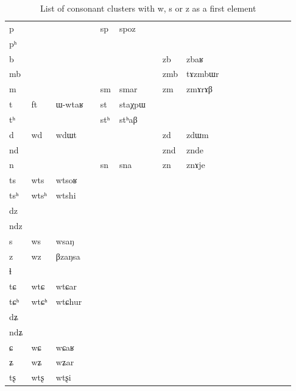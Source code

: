 \documentclass[oldfontcommands,oneside,a4paper,11pt]{article}
\newcommand{\ipa}[1]{{\phon #1}} %
\begin{document}
 
 \begin{table}
 \caption{List of consonant clusters with \ipa{w}, \ipa{s} or \ipa{z} as a first element}
\begin{tabular}{l|lll|lll|lll|lllllll}
\ipa{p}  &	  &	  &	&	\ipa{sp}  &	\ipa{spoz}  &	&	  &	  &	&	\\
\ipa{pʰ}  &	  &	  &	&	  &	  &	&	  &	  &	&	\\
\ipa{b}  &	  &	  &	&	  &	  &	&	\ipa{zb}  &	\ipa{zbaʁ}  &	&	\\
\ipa{mb}  &	  &	  &	&	  &	  &	&	\ipa{zmb}  &	\ipa{tɤzmbɯr}  &	&	\\
\ipa{m}  &	  &	  &	&	\ipa{sm}  &	\ipa{smar}  &	&	\ipa{zm}  &	\ipa{zmɤrɤβ}  &	&	\\
\ipa{t}  &	\ipa{ft}  &	\ipa{ɯ-wtaʁ}  &	&	\ipa{st}  &	\ipa{staχpɯ}  &	&	  &	  &	&	\\
\ipa{tʰ}  &	  &	  &	&	\ipa{stʰ}  &	\ipa{stʰaβ}  &	&	  &	  &	&	\\
\ipa{d}  &	\ipa{wd}  &	\ipa{wdɯt}  &	&	  &	  &	&	\ipa{zd}  &	\ipa{zdɯm}  &	&	\\
\ipa{nd}  &	  &	  &	&	  &	  &	&	\ipa{znd}  &	\ipa{znde}  &	&	\\
\ipa{n}  &	  &	  &	&	\ipa{sn}  &	\ipa{sna}  &	&	\ipa{zn}  &	\ipa{znɤje}  &	&	\\
\ipa{ts}  &	\ipa{wts}  &	\ipa{wtsoʁ}  &	&	  &	  &	&	  &	  &	&	\\
\ipa{tsʰ}  &	\ipa{wtsʰ}  &	\ipa{wtshi}  &	&	  &	  &	&	  &	  &	&	\\
\ipa{dz}  &	  &	  &	&	  &	  &	&	  &	  &	&	\\
\ipa{ndz}  &	  &	  &	&	  &	  &	&	  &	  &	&	\\
\ipa{s}  &	\ipa{ws}  &	\ipa{wsaŋ}  &	&	  &	  &	&	  &	  &	&	\\
\ipa{z}  &	\ipa{wz}  &	\ipa{βzaŋsa}  &	&	  &	  &	&	  &	  &	&	\\
\ipa{ɬ}  &	  &	  &	&	  &	  &	&	  &	  &	&	\\
\ipa{tɕ}  &	\ipa{wtɕ}  &	\ipa{wtɕar }  &	&	  &	  &	&	  &	  &	&	\\
\ipa{tɕʰ}  &	\ipa{wtɕʰ}  &	\ipa{wtɕhur}  &	&	  &	  &	&	  &	  &	&	\\
\ipa{dʑ}  &	  &	  &	&	  &	  &	&	  &	  &	&	\\
\ipa{ndʑ}  &	  &	  &	&	  &	  &	&	  &	  &	&	\\
\ipa{ɕ}  &	\ipa{wɕ}  &	\ipa{wɕaʁ}  &	&	  &	  &	&	  &	  &	&	\\
\ipa{ʑ}  &	\ipa{wʑ}  &	\ipa{wʑar }  &	&	  &	  &	&	  &	  &	&	\\
\ipa{tʂ}  &	\ipa{wtʂ}  &	\ipa{wtʂi}  &	&	  &	  &	&	  &	  &	&	\\

\end{tabular}
\end{table}
\end{document}
